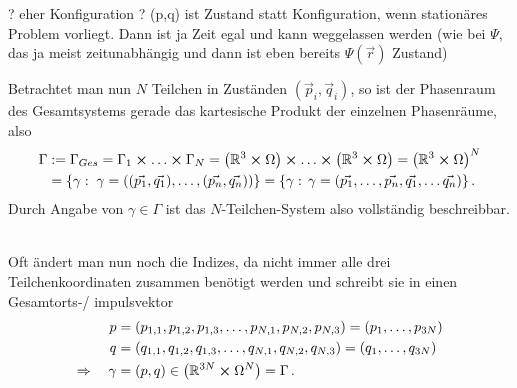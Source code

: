 \documentclass[../KlassMech_main.tex]{subfiles}
\begin{document}
? eher Konfiguration ? (p,q) ist Zustand statt Konfiguration, wenn stationäres Problem vorliegt. Dann ist ja Zeit egal und kann weggelassen werden (wie bei $\Psi$, das ja meist zeitunabhängig und dann ist eben bereits $\Psi(\vec{r})$ Zustand)



Betrachtet man nun $N$ Teilchen in Zuständen $(\vec{p}_i, \vec{q}_i)$, so ist der Phasenraum des Gesamtsystems gerade das kartesische Produkt der einzelnen Phasenräume, also
\begin{equation}
\begin{split}
\Gamma &:= \Gamma_{Ges} = \Gamma_1 \cross \dots \cross \Gamma_N = \qty(\mathbb{R}^3 \cross \Omega) \cross \dots \cross \qty(\mathbb{R}^3 \cross \Omega) = \qty(\mathbb{R}^3 \cross \Omega)^N
\\
&= \qty{\gamma: \; \gamma = \qty((\vec{p_1}, \vec{q_1}), \dots, (\vec{p_n}, \vec{q_n}))} = \qty{\gamma: \, \gamma = \qty(\vec{p_1}, \dots, \vec{p_n}, \vec{q_1}, \dots \vec{q_n})} \, .
\end{split}
\end{equation}
Durch Angabe von $\gamma \in \Gamma$ ist das $N$-Teilchen-System also vollständig beschreibbar.

	\\

Oft ändert man nun noch die Indizes, da nicht immer alle drei Teilchenkoordinaten zusammen benötigt werden und schreibt sie in einen Gesamtorts-/ impulsvektor
\begin{align}
p &= (p_{1,1}, p_{1,2}, p_{1,3}, \dots, p_{N,1}, p_{N,2}, p_{N,3}) = (p_1, \dots, p_{3N})
\\
q &= (q_{1,1}, q_{1,2}, q_{1,3}, \dots, q_{N,1}, q_{N,2}, q_{N,3}) = (q_1, \dots, q_{3N})
\\
\Rightarrow \quad \gamma &= (p, q) \in \qty(\mathbb{R}^{3N} \cross \Omega^{N}) = \Gamma \, .
\end{align}
\end{document}
